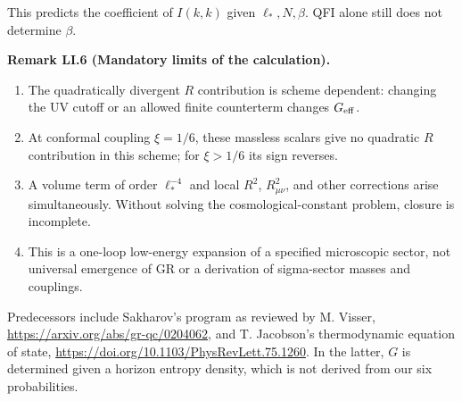 \documentclass[11pt,a4paper,oneside]{book}
\newcommand{\statement}[3]{\par\medskip\noindent\textbf{#1 #2 (#3).}\ }
\begin{document}
This predicts the coefficient of $I(k,k)$ given $\ell_*,N,\beta$. QFI alone still does not determine $\beta$.
\statement{Remark}{LI.6}{Mandatory limits of the calculation}
\begin{enumerate}[label=(\roman*)]
\item The quadratically divergent $R$ contribution is scheme dependent: changing the UV cutoff or an allowed finite counterterm changes $G_{\rm eff}$.
\item At conformal coupling $\xi=1/6$, these massless scalars give no quadratic $R$ contribution in this scheme; for $\xi>1/6$ its sign reverses.
\item A volume term of order $\ell_*^{-4}$ and local $R^2$, $R_{\mu\nu}^2$, and other corrections arise simultaneously. Without solving the cosmological-constant problem, closure is incomplete.
\item This is a one-loop low-energy expansion of a specified microscopic sector, not universal emergence of GR or a derivation of sigma-sector masses and couplings.
\end{enumerate}
Predecessors include Sakharov's program as reviewed by M. Visser, \url{https://arxiv.org/abs/gr-qc/0204062}, and T. Jacobson's thermodynamic equation of state, \url{https://doi.org/10.1103/PhysRevLett.75.1260}. In the latter, $G$ is determined given a horizon entropy density, which is not derived from our six probabilities.
\end{document}
